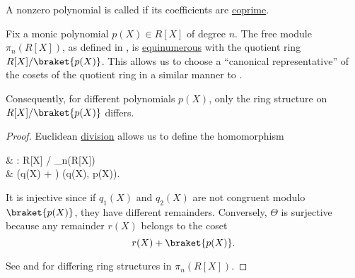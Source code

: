 \begin{definition}\label{def:primitive_polynomial}
  A nonzero polynomial is called  if its coefficients are \hyperref[def:coprime_ring_ideals]{coprime}.
\end{definition}

\begin{proposition}\label{thm:polynomial_quotient_rings_equinumerous_with_module_of_polynomials}
  Fix a monic polynomial \( p(X) \in R[X] \) of degree \( n \). The free module \( \pi_n(R[X]) \), as defined in , is \hyperref[def:equinumerous_sets]{equinumerous} with the quotient ring \( R[X] / \braket{p(X)} \). This allows us to choose a \enquote{canonical representative} of the cosets of the quotient ring in a similar manner to .

  Consequently, for different polynomials \( p(X) \), only the ring structure on \( R[X] / \braket{p(X)} \) differs.
\end{proposition}
\begin{proof}
  Euclidean \hyperref[thm:euclidean_division_of_polynomials]{division} allows us to define the homomorphism
  \begin{balign*}
     & \Theta: R[X] /  \to \pi_n(R[X])             \\
     & \Theta(q(X) + ) \coloneqq \rem(q(X), p(X)).
  \end{balign*}

  It is injective since if \( q_1(X) \) and \( q_2(X) \) are not congruent modulo \( \braket{p(X)} \), they have different remainders. Conversely, \( \Theta \) is surjective because any remainder \( r(X) \) belongs to the coset
  \begin{equation*}
    r(X) + \braket{p(X)}.
  \end{equation*}

  See  and  for differing ring structures in \( \pi_n(R[X]) \).
\end{proof}

